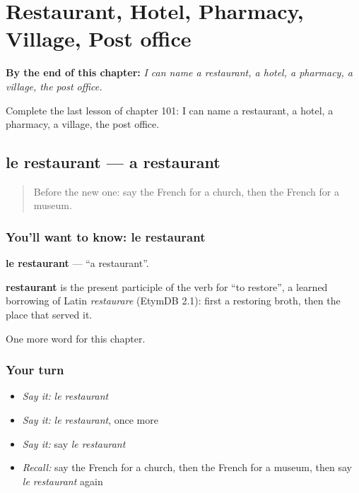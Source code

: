 
\chapter{Restaurant, Hotel, Pharmacy, Village, Post office}
\label{ch:fr-restaurant-hotel-pharmacy-village-post-office}

\begin{chapteropening}
\textbf{By the end of this chapter:} \emph{I can name a restaurant, a hotel, a pharmacy, a village, the post office.}

Complete the last lesson of chapter 101: I can name a restaurant, a hotel, a pharmacy, a village, the post office.
\end{chapteropening}

\section[le restaurant]{le restaurant — a restaurant}

\label{lesson:FR-C101-restaurant}



\begin{quote}
Before the new one: say the French for a church, then the French for a museum.
\end{quote}

\subsection*{You'll want to know: le restaurant}
\textbf{le restaurant} — \textquotedblleft{}a restaurant\textquotedblright{}.

\begin{cousinweb}
\textbf{restaurant} is the present participle of the verb for \textquotedblleft{}to restore\textquotedblright{}, a learned borrowing of Latin \emph{restaurare} (EtymDB 2.1): first a restoring broth, then the place that served it.
\end{cousinweb}

\begin{grammarlens}[title={What you've built}]
One more word for this chapter.
\end{grammarlens}

\subsection*{Your turn}
\begin{itemize}
\raggedright
  \item \emph{Say it:} \emph{le restaurant}
  \item \emph{Say it:} \emph{le restaurant}, once more
  \item \emph{Say it:} say \emph{le restaurant}
  \item \emph{Recall:} say the French for a church, then the French for a museum, then say \emph{le restaurant} again
\end{itemize}


